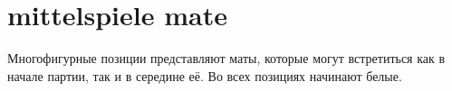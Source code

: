 \section*{mittelspiele mate}

Многофигурные позиции представляют маты, которые могут встретиться как в начале партии, так и в середине её. Во всех позициях начинают белые.